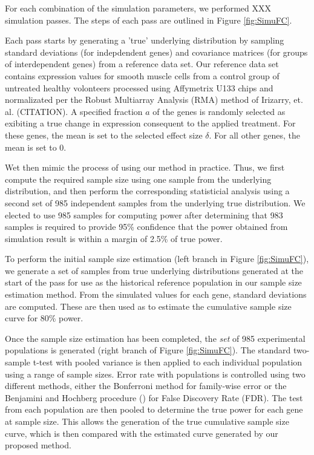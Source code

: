 \documentclass{bioinfo}
\begin{document}
For each combination of the simulation parameters, we performed XXX
simulation passes.  The steps of each pass are outlined in Figure
\ref{fig:SimuFC}.

Each pass starts by generating a 'true' underlying distribution by
sampling standard deviations (for indepdendent genes) and covariance
matrices (for groups of interdependent genes) from a reference data
set.  Our reference data set contains expression values for smooth
muscle cells from a control group of untreated healthy volonteers
processed using Affymetrix U133 chips and normalizated per the
Robust Multiarray Analysis (RMA) method of Irizarry,
et. al. (CITATION).  A specified fraction $a$ of the genes is
randomly selected as exibiting a true change in expression
consequent to the applied treatment.  For these genes, the mean is
set to the selected effect size $\delta$.  For all other genes, the
mean is set to $0$.

Wet then mimic the process of using our method in practice. Thus, we
first compute the required sample size using one sample from the
underlying distribution, and then perform the corresponding
statisticial analysis using a second set of 985 independent samples
from the underlying true distribution.  We elected to use 985
samples for computing power after determining that 983 samples is
required to provide 95\% confidence that the power obtained from
simulation result is within a margin of 2.5\% of true power.

To perform the initial sample size estimation (left branch in Figure
\ref{fig:SimuFC}), we generate a set of samples from true underlying
distributions generated at the start of the pass for use as the
historical reference population in our sample size estimation
method.  From the simulated values for each gene, standard
deviations are computed. These are then used as to estimate the
cumulative sample size curve for 80\% power.

Once the sample size estimation has been completed, the \emph{set}
of 985 experimental populations is generated (right branch of Figure
\ref{fig:SimuFC}).  The standard two-sample t-test with pooled
variance is then applied to each individual population using a range
of sample sizes. Error rate with populations is controlled using two
different methods, either the Bonferroni method for family-wise
error or the Benjamini and Hochberg procedure
(\citealp{Benjamini95}) for False Discovery Rate (FDR).  The test
from each population are then pooled to determine the true power for
each gene at sample size. This allows the generation of the true
cumulative sample size curve, which is then compared with the
estimated curve generated by our proposed method.
\end{document}
